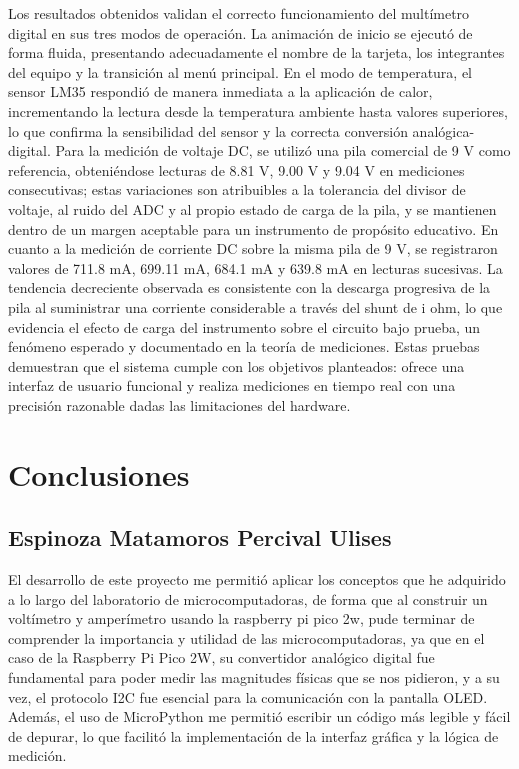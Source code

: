 \documentclass[letterpaper,12pt]{article}
\begin{document}
    Los resultados obtenidos validan el correcto funcionamiento del multímetro digital en sus tres modos de operación. La animación de inicio se ejecutó de forma fluida, presentando adecuadamente el nombre de la tarjeta, los integrantes del equipo y la transición al menú principal. En el modo de temperatura, el sensor LM35 respondió de manera inmediata a la aplicación de calor, incrementando la lectura desde la temperatura ambiente hasta valores superiores, lo que confirma la sensibilidad del sensor y la correcta conversión analógica-digital. Para la medición de voltaje DC, se utilizó una pila comercial de 9 V como referencia, obteniéndose lecturas de 8.81 V, 9.00 V y 9.04 V en mediciones consecutivas; estas variaciones son atribuibles a la tolerancia del divisor de voltaje, al ruido del ADC y al propio estado de carga de la pila, y se mantienen dentro de un margen aceptable para un instrumento de propósito educativo. En cuanto a la medición de corriente DC sobre la misma pila de 9 V, se registraron valores de 711.8 mA, 699.11 mA, 684.1 mA y 639.8 mA en lecturas sucesivas. La tendencia decreciente observada es consistente con la descarga progresiva de la pila al suministrar una corriente considerable a través del shunt de i ohm, lo que evidencia el efecto de carga del instrumento sobre el circuito bajo prueba, un fenómeno esperado y documentado en la teoría de mediciones. Estas pruebas demuestran que el sistema cumple con los objetivos planteados: ofrece una interfaz de usuario funcional y realiza mediciones en tiempo real con una precisión razonable dadas las limitaciones del hardware.


    \section{Conclusiones}

        \subsection{Espinoza Matamoros Percival Ulises}

        El desarrollo de este proyecto me permitió aplicar los conceptos que he adquirido a lo largo del laboratorio de microcomputadoras, de forma que al construir un voltímetro y amperímetro usando la raspberry pi pico 2w, pude terminar de comprender la importancia y utilidad de las microcomputadoras, ya que en el caso de la Raspberry Pi Pico 2W, su convertidor analógico digital fue fundamental para poder medir las magnitudes físicas que se nos pidieron, y a su vez, el protocolo I2C fue esencial para la comunicación con la pantalla OLED. Además, el uso de MicroPython me permitió escribir un código más legible y fácil de depurar, lo que facilitó la implementación de la interfaz gráfica y la lógica de medición.
\end{document}
